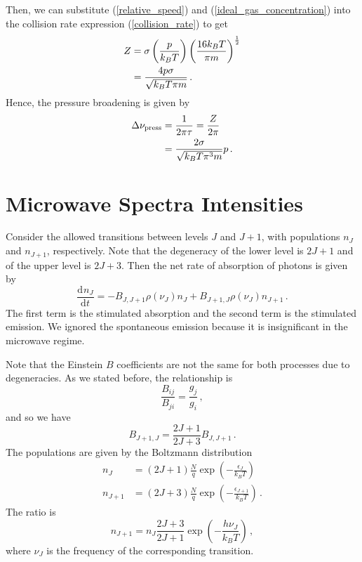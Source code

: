 \documentclass{article}
\theoremstyle{plain}\theoremheaderfont{\normalfont\itshape}\theorembodyfont{\rmfamily}\theoremseparator{.}\newtheorem*{rem}{Remark}\newtheorem*{ex}{Example}\newtheorem*{proof}{Proof}\newtheorem*{altp}{Alternative proof}
\theoremstyle{plain}\theoremheaderfont{\normalfont\bfseries}\theorembodyfont{\rmfamily}\theoremseparator{.}\newtheorem{thm}{Theorem}[section]\newtheorem{lem}[thm]{Lemma}\newtheorem{prop}[thm]{Proposition}\newtheorem*{cor}{Corollary}\newtheorem{defn}[thm]{Definition}\newtheorem{clm}[thm]{Claim}\newtheorem{clminproof}{Claim}\newtheorem{pos}{Postulate}[section]
\theoremstyle{break}\theoremheaderfont{\normalfont\itshape}\theorembodyfont{\rmfamily}\theoremseparator{.\medskip}\newtheorem*{proofskip}{Proof}\newtheorem*{exs}{Examples}\newtheorem*{rems}{Remarks}
\theoremstyle{break}\theoremheaderfont{\normalfont\bfseries}\theorembodyfont{\rmfamily}\theoremseparator{.\medskip}\newtheorem{lemskip}[thm]{Lemma}\newtheorem{defnskip}[thm]{Definition}\newtheorem{propskip}[thm]{Proposition}\newtheorem{thmskip}[thm]{Theorem}
\numberwithin{equation}{section}
\newcommand{\dv}[3][]{\frac{\mathrm{d}^{#1} #2}{{\mathrm{d} #3}^{#1}}}
\begin{document}
    Then, we can substitute (\ref{relative_speed}) and (\ref{ideal_gas_concentration}) into the collision rate expression (\ref{collision_rate}) to get
    \begin{align}
        Z&=\sigma\left(\frac{p}{k_B T}\right)\left(\frac{16k_B T}{\pi m}\right)^{\frac{1}{2}}\notag\\
        &=\frac{4p\sigma}{\sqrt{k_B T\pi m}}\,.
    \end{align}
    Hence, the pressure broadening is given by
    \begin{align}
        \Delta \nu_{\text{press}}&=\frac{1}{2\pi\tau}=\frac{Z}{2\pi}\notag\\
        &=\frac{2\sigma}{\sqrt{k_B T\pi^3 m}}p\,.
    \end{align}

    \section{Microwave Spectra Intensities}\label{Chap:microwave_intensity}
    Consider the allowed transitions between levels \(J\) and \(J+1\), with populations \(n_J\) and \(n_{J+1}\), respectively. Note that the degeneracy of the lower level is \(2J+1\) and of the upper level is \(2J+3\). Then the net rate of absorption of photons is given by
    \begin{equation}
        \dv{n_J}{t}=-B_{J,J+1}\rho(\nu_J)n_J+B_{J+1,J}\rho(\nu_J)n_{J+1}\,.
    \end{equation}
    The first term is the stimulated absorption and the second term is the stimulated emission. We ignored the spontaneous emission because it is insignificant in the microwave regime.

    Note that the Einstein \(B\) coefficients are not the same for both processes due to degeneracies. As we stated before, the relationship is
    \begin{equation}
        \frac{B_{ij}}{B_{ji}}=\frac{g_j}{g_i}\,,
    \end{equation}
    and so we have
    \begin{equation}
        B_{J+1,J}=\frac{2J+1}{2J+3}B_{J,J+1}\,.
    \end{equation}
    The populations are given by the Boltzmann distribution
    \begin{align}
        n_J&=(2J+1)\frac{N}{q}\exp\left(-\frac{\epsilon_J}{k_B T}\right)\\
        n_{J+1}&=(2J+3)\frac{N}{q}\exp\left(-\frac{\epsilon_{J+1}}{k_B T}\right)\,.
    \end{align}
    The ratio is
    \begin{equation}
        n_{J+1}=n_J\frac{2J+3}{2J+1}\exp\left(-\frac{h\nu_J}{k_B T}\right)\,,
    \end{equation}
    where \(\nu_J\) is the frequency of the corresponding transition.
\end{document}
